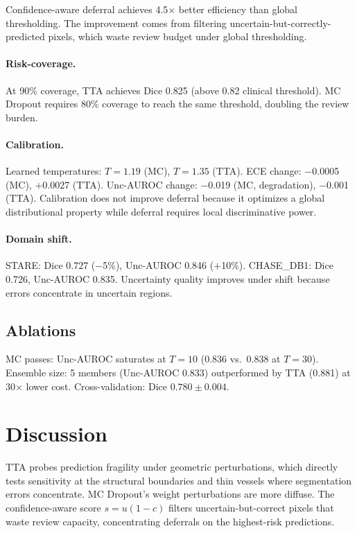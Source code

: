 \documentclass[smallextended]{svjour3}
\begin{document}
Confidence-aware deferral achieves 4.5$\times$ better efficiency than global
thresholding. The improvement comes from filtering uncertain-but-correctly-predicted
pixels, which waste review budget under global thresholding.

\paragraph{Risk-coverage.}
At 90\% coverage, TTA achieves Dice 0.825 (above 0.82 clinical threshold).
MC Dropout requires 80\% coverage to reach the same threshold, doubling the
review burden.

\paragraph{Calibration.}
Learned temperatures: $T = 1.19$ (MC), $T = 1.35$ (TTA). ECE change: $-$0.0005
(MC), $+$0.0027 (TTA). Unc-AUROC change: $-$0.019 (MC, degradation), $-$0.001
(TTA). Calibration does not improve deferral because it optimizes a global
distributional property while deferral requires local discriminative power.

\paragraph{Domain shift.}
STARE: Dice 0.727 ($-$5\%), Unc-AUROC 0.846 ($+$10\%). CHASE\_DB1: Dice 0.726,
Unc-AUROC 0.835. Uncertainty quality improves under shift because errors
concentrate in uncertain regions.

\subsection{Ablations}

MC passes: Unc-AUROC saturates at $T = 10$ (0.836 vs.\ 0.838 at $T = 30$).
Ensemble size: 5 members (Unc-AUROC 0.833) outperformed by TTA (0.881) at
30$\times$ lower cost. Cross-validation: Dice $0.780 \pm 0.004$.

\section{Discussion}

TTA probes prediction fragility under geometric perturbations, which directly
tests sensitivity at the structural boundaries and thin vessels where
segmentation errors concentrate. MC Dropout's weight perturbations are more
diffuse. The confidence-aware score $s = u(1-c)$ filters uncertain-but-correct
pixels that waste review capacity, concentrating deferrals on the
highest-risk predictions.
\end{document}
